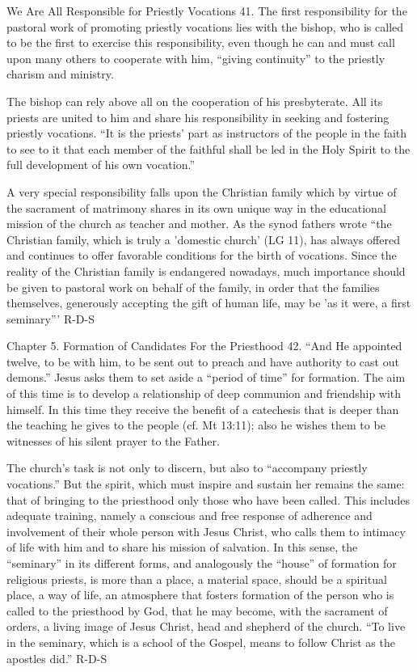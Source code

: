 \documentclass[oneside]{book}
\begin{document}
We Are All Responsible for Priestly Vocations
41. The first responsibility for the pastoral work of promoting priestly
vocations lies with the bishop, who is called to be the first to exercise this
responsibility, even though he can and must call upon many others to cooperate
with him, ``giving continuity'' to the priestly charism and ministry.

The bishop can rely above all on the cooperation of his presbyterate. All its
priests are united to him and share his responsibility in seeking and fostering
priestly vocations. ``It is the priests' part as instructors of the people in
the faith to see to it that each member of the faithful shall be led in the Holy
Spirit to the full development of his own vocation.''

A very special responsibility falls upon the Christian family which by virtue of
the sacrament of matrimony shares in its own unique way in the educational
mission of the church as teacher and mother. As the synod fathers wrote ``the
Christian family, which is truly a 'domestic church' (LG 11), has always offered
and continues to offer favorable conditions for the birth of vocations. Since
the reality of the Christian family is endangered nowadays, much importance
should be given to pastoral work on behalf of the family, in order that the
families themselves, generously accepting the gift of human life, may be 'as it
were, a first seminary'''
R-D-S

Chapter 5. Formation of Candidates For the Priesthood
42. ``And He appointed twelve, to be with him, to be sent out to preach and have
authority to cast out demons.'' Jesus asks them to set aside a ``period of
time'' for formation. The aim of this time is to develop a relationship of deep
communion and friendship with himself. In this time they receive the benefit of
a catechesis that is deeper than the teaching he gives to the people (cf. Mt
13:11); also he wishes them to be witnesses of his silent prayer to the Father.

The church's task is not only to discern, but also to ``accompany priestly
vocations.'' But the spirit, which must inspire and sustain her remains the
same: that of bringing to the priesthood only those who have been called. This
includes adequate training, namely a conscious and free response of adherence
and involvement of their whole person with Jesus Christ, who calls them to
intimacy of life with him and to share his mission of salvation. In this sense,
the ``seminary'' in its different forms, and analogously the ``house'' of
formation for religious priests, is more than a place, a material space, should
be a spiritual place, a way of life, an atmosphere that fosters formation of the
person who is called to the priesthood by God, that he may become, with the
sacrament of orders, a living image of Jesus Christ, head and shepherd of the
church. ``To live in the seminary, which is a school of the Gospel, means to
follow Christ as the apostles did.''
R-D-S
\end{document}
